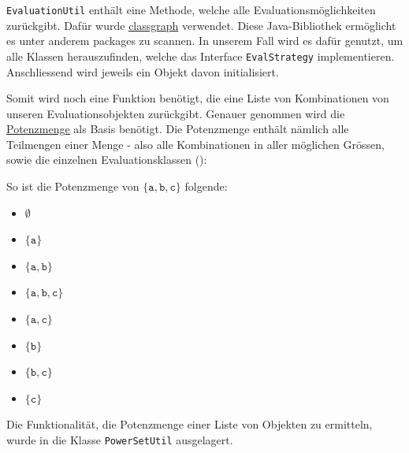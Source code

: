 \texttt{EvaluationUtil} enthält eine Methode, welche alle Evaluationsmöglichkeiten zurückgibt.
Dafür wurde \href{https://github.com/classgraph/classgraph}{classgraph} verwendet. Diese Java-Bibliothek ermöglicht es
unter anderem packages zu scannen. In unserem Fall wird es dafür genutzt, um alle Klassen herauszufinden, welche
das Interface \texttt{EvalStrategy} implementieren. Anschliessend wird jeweils ein Objekt davon initialisiert.

Somit wird noch eine Funktion benötigt, die eine Liste von Kombinationen von unseren Evaluationsobjekten zurückgibt.
Genauer genommen wird die \href{https://de.wikipedia.org/wiki/Potenzmenge}{Potenzmenge} als Basis benötigt.
Die Potenzmenge enthält nämlich alle Teilmengen einer Menge - also alle Kombinationen in aller möglichen Grössen, sowie
die einzelnen Evaluationsklassen (\cite{potenzmenge}):

So ist die Potenzmenge von $\{\texttt{a}, \texttt{b}, \texttt{c}\}$ folgende:

\begin{itemize}[noitemsep,topsep=0pt]
    \item $\emptyset$
    \item $\{\texttt{a}\}$
    \item $\{\texttt{a}, \texttt{b}\}$
    \item $\{\texttt{a}, \texttt{b}, \texttt{c}\}$
    \item $\{\texttt{a}, \texttt{c}\}$
    \item $\{\texttt{b}\}$
    \item $\{\texttt{b}, \texttt{c}\}$
    \item $\{\texttt{c}\}$
\end{itemize}

Die Funktionalität, die Potenzmenge einer Liste von Objekten zu ermitteln, wurde in die Klasse \texttt{PowerSetUtil} ausgelagert.

